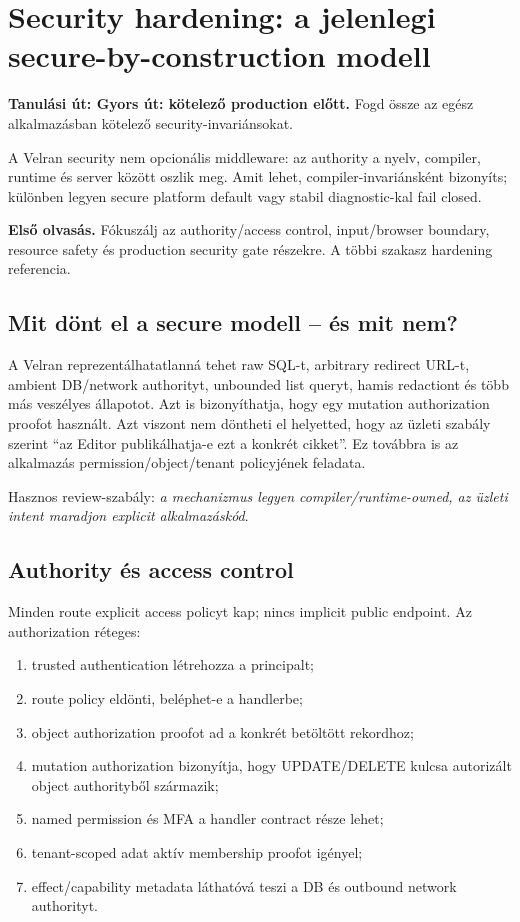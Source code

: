 \chapter{Security hardening: a jelenlegi secure-by-construction modell}

\noindent\textbf{Tanulási út: Gyors út: kötelező production előtt.} Fogd össze az egész alkalmazásban kötelező security-invariánsokat.\par\medskip

A Velran security nem opcionális middleware: az authority a nyelv, compiler, runtime és server között oszlik meg. Amit lehet, compiler-invariánsként bizonyíts; különben legyen secure platform default vagy stabil diagnostic-kal fail closed.

\noindent\textbf{Első olvasás.} Fókuszálj az authority/access control, input/browser boundary, resource safety és production security gate részekre. A többi szakasz hardening referencia.\par\medskip

\section{Mit dönt el a secure modell -- és mit nem?}

A Velran reprezentálhatatlanná tehet raw SQL-t, arbitrary redirect URL-t, ambient DB/network authorityt, unbounded list queryt, hamis redactiont és több más veszélyes állapotot. Azt is bizonyíthatja, hogy egy mutation authorization proofot használt. Azt viszont nem döntheti el helyetted, hogy az üzleti szabály szerint ``az Editor publikálhatja-e ezt a konkrét cikket''. Ez továbbra is az alkalmazás permission/object/tenant policyjének feladata.

Hasznos review-szabály: \emph{a mechanizmus legyen compiler/runtime-owned, az üzleti intent maradjon explicit alkalmazáskód}.

\section{Authority és access control}

Minden route explicit access policyt kap; nincs implicit public endpoint. Az authorization réteges:

\begin{enumerate}
  \item trusted authentication létrehozza a principalt;
  \item route policy eldönti, beléphet-e a handlerbe;
  \item object authorization proofot ad a konkrét betöltött rekordhoz;
  \item mutation authorization bizonyítja, hogy UPDATE/DELETE kulcsa autorizált object authorityből származik;
  \item named permission és MFA a handler contract része lehet;
  \item tenant-scoped adat aktív membership proofot igényel;
  \item effect/capability metadata láthatóvá teszi a DB és outbound network authorityt.
\end{enumerate}

